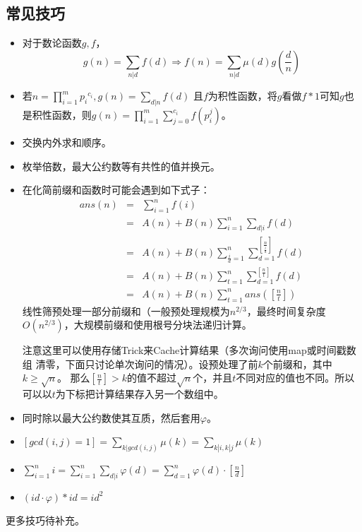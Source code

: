 \subsection{常见技巧}
\begin{itemize}
	\item
	      对于数论函数$g,f$，
	      \begin{displaymath}
		      g(n)=\sum_{n|d}{f(d)}\Rightarrow
		      f(n)=\sum_{n|d}{\mu(d)g(\frac{d}{n})}
	      \end{displaymath}
	\item
	      若$\displaystyle n=\prod_{i=1}^m{{p_i}^{c_i}},g(n)=\sum_{d|n}{f(d)}$
	      且$f$为积性函数，将$g$看做$f*1$可知$g$也是积性函数，则$g(n)=\prod_{i=1}^m
		      {\sum_{j=0}^{c_i}{f(p_i^j)}}$。
	\item 交换内外求和顺序。
	\item 枚举倍数，最大公约数等有共性的值并换元。
	\item 在化简前缀和函数时可能会遇到如下式子：
		\begin{eqnarray*}
			ans(n)&=&\sum_{i=1}^n{f(i)}\\
			&=&A(n)+B(n)\sum_{i=1}^n{\sum_{d|i}{f(d)}}\\
			&=&A(n)+B(n)\sum_{\frac{i}{d}=1}^n{\sum_{d=1}^{[\frac{n}{\frac{i}{d}}]}{f(d)}}\\
			&=&A(n)+B(n)\sum_{t=1}^n{\sum_{d=1}^{[\frac{n}{t}]}{f(d)}}\\
			&=&A(n)+B(n)\sum_{t=1}^n{ans([\frac{n}{t}])}
	      \end{eqnarray*}
		线性筛预处理一部分前缀和（一般预处理规模为$n^{2/3}$，最终时间复杂度
		$O(n^{2/3})$，大规模前缀和使用根号分块法递归计算。

		注意这里可以使用存储Trick来Cache计算结果（多次询问使用map或时间戳数组
		清零，下面只讨论单次询问的情况）。设预处理了前$k$个前缀和，其中$k\geq \sqrt{n}$。
		那么$[\frac{n}{t}]>k$的值不超过$\sqrt{n}$个，并且$t$不同对应的值也不同。所以
		可以以$t$为下标把计算结果存入另一个数组中。
	\item 同时除以最大公约数使其互质，然后套用$\varphi$。
	\item $\displaystyle [gcd(i,j)=1]=\sum_{k|gcd(i,j)}\mu(k)=
		      \sum_{k|i,k|j}\mu(k)$
	\item $\displaystyle \sum_{i=1}^n{i}=
		      \sum_{i=1}^n{\sum_{d|i}\varphi(d)}=
		      \sum_{d=1}^n{\varphi(d)\cdot[\frac{n}{d}]}$
	\item $(id\cdot\varphi)*id=id^2$
\end{itemize}
更多技巧待补充。
